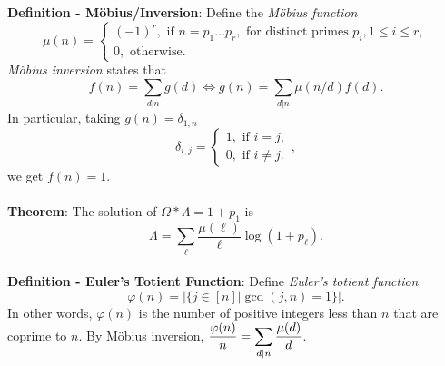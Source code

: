 \documentclass{article}
\begin{document}
\textbf{Definition - Möbius/Inversion}: Define the \textit{Möbius function} $$\mu(n) = \begin{cases}
    (-1)^r, \text{ if } n = p_1 \dots p_r, \text{ for distinct primes } p_i, 1 \leq i \leq r, \\
    0, \text{ otherwise.}
\end{cases}$$ \textit{Möbius inversion} states that $$f(n) = \sum_{d | n} g(d) \iff g(n) = \sum_{d|n} \mu(n/d) f(d).$$ In particular, taking $g(n) = \delta_{1, n}$ $$\delta_{i, j} = \begin{cases}
    1, \text{ if } i = j, \\
    0, \text{ if } i \neq j.
\end{cases},$$ we get $f(n) = 1$. \\ \\
\textbf{Theorem}: The solution of $\Omega \ast \Lambda = 1 + p_1$ is $$\Lambda = \sum_\ell \frac{\mu(\ell)}{\ell} \log(1 + p_\ell).$$ \\
\textbf{Definition - Euler's Totient Function}: Define \textit{Euler's totient function} $$\varphi(n) = |\{j \in [n] | \gcd(j, n) = 1\}|.$$ In other words, $\varphi(n)$ is the number of positive integers less than $n$ that are coprime to $n$. By Möbius inversion, $\mathlarger{\frac{\varphi(n)}{n} = \sum_{d|n} \frac{\mu(d)}{d}}$.
\end{document}
